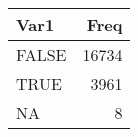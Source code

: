 
\begin{tabular}[t]{lr}
\toprule
Var1 & Freq\\
\midrule
FALSE & 16734\\
TRUE & 3961\\
NA & 8\\
\bottomrule
\end{tabular}